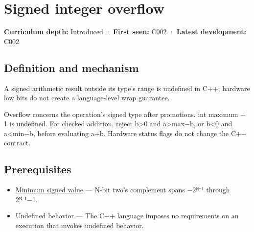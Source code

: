 \hypertarget{appendix-1a599c924a4e}{}\label{referencestart:appendix-1a599c924a4e}
\section{Signed integer overflow}\label{appendix-1a599c924a4e-signed-integer-overflow}

\hypertarget{appendix-1a599c924a4e-signed-integer-overflow}{}

\textbf{Curriculum depth:} Introduced · \textbf{First seen:} C002 · \textbf{Latest development:} C002

\begin{allmightroledefinition}

\subsection{Definition and mechanism}\label{appendix-1a599c924a4e-definition-and-mechanism}

\hypertarget{appendix-1a599c924a4e-definition-and-mechanism}{}

A signed arithmetic result outside its type's range is undefined in C++; hardware low bits do not create a language-level wrap guarantee.

\end{allmightroledefinition}

Overflow concerns the operation's signed type after promotions. int maximum + 1 is undefined. For checked addition, reject b\textgreater0 and a\textgreater max−b, or b\textless0 and a\textless min−b, before evaluating a+b. Hardware status flags do not change the C++ contract.

\subsection{Prerequisites}\label{appendix-1a599c924a4e-prerequisites}

\hypertarget{appendix-1a599c924a4e-prerequisites}{}

\begin{itemize}
\tightlist
\item
  \hyperref[appendix-05f39b10364d]{Minimum signed value} --- N-bit two's complement spans −2ᴺ⁻¹ through 2ᴺ⁻¹−1.
\item
  \hyperref[appendix-f558f5b4d8f2]{Undefined behavior} --- The C++ language imposes no requirements on an execution that invokes undefined behavior.
\end{itemize}

